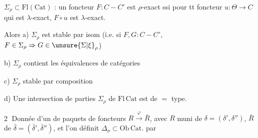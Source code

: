 $\Sigma_\rho\subset\mathrm{Fl}(\mathrm{Cat})$ : un foncteur $F:C-C'$ est $\rho$-exact ssi pour tt  foncteur $u:\Theta\to C$ qui est $\lambda$-exact, $F\circ u$ est $\lambda$-exact.

Alors \quad a) $\Sigma_\rho$ est stable par isom (i.e. si $F,G:C-C'$,  $F\in\Sigma_\rho\Rightarrow G\in\unsure{\Sigma|\xi}_\rho$)

b) $\Sigma_\rho$ contient les équivalences de catégories

c) $\Sigma_\rho$ stable par composition

d) Une intersection de parties $\Sigma_\rho$ de $\mathrm{Fl}\,\mathrm{Cat}$ est de $=$ type.

\textcircled{2} Donnée d'un  de paquets de foncteurs $R\xrightarrow{\varphi}\bar R$, avec \deleted{\unsure{$\varphi$}} $R$ muni de $\delta=(\delta',\delta'')$, $\bar R$ de $\bar\delta=(\bar\delta',\bar\delta'')$, et  l'on définit $\Delta_\sigma\subset\mathrm{Ob}\,\mathrm{Cat}$. par

